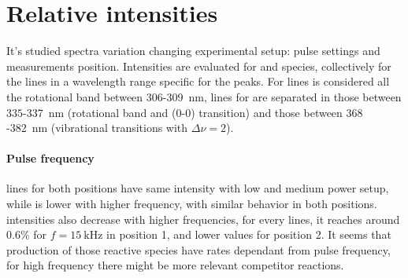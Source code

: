 \section{Relative intensities}
It's studied spectra variation changing experimental setup: pulse settings and measurements position.
Intensities are evaluated for  and  species, collectively for the lines in a wavelength range specific for the peaks. For  lines is considered all the rotational band between $\num{306}$-\SI{309}{\nano\meter}, lines for  are separated in those between $\num{335}$-\SI{337}{\nano\meter} (rotational band and (0-0) transition) and those between $\num{368}$-\SI{382}{\nano\meter} (vibrational transitions with $\Delta \nu = 2$).

\paragraph{Pulse frequency}  lines for both positions have same intensity with low and medium power setup, while is lower with higher frequency, with similar behavior in both positions.  intensities also decrease with higher frequencies, for every lines, it reaches around $0.6\%$ for $f = \SI{15}{\kilo\hertz}$ in position 1, and lower values for position 2. It seems that production of those reactive species have rates dependant from pulse frequency, for high frequency there might be more relevant competitor reactions.

